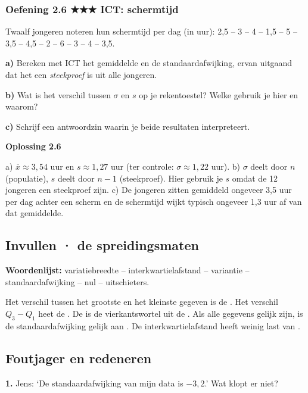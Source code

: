 \subsubsection*{Oefening 2.6 \quad ★★★ \quad ICT: schermtijd}

Twaalf jongeren noteren hun schermtijd per dag (in uur): 2,5 – 3 – 4 – 1,5 – 5 – 3,5 – 4,5 – 2 – 6 – 3 – 4 – 3,5.

\textbf{a)} Bereken met ICT het gemiddelde en de standaardafwijking, ervan uitgaand dat het een \emph{steekproef} is uit alle jongeren. \lijn

\textbf{b)} Wat is het verschil tussen $\sigma$ en $s$ op je rekentoestel? Welke gebruik je hier en waarom? \lijn

\textbf{c)} Schrijf een antwoordzin waarin je beide resultaten interpreteert. \lijn

\begin{oplossing}
\textbf{Oplossing 2.6}

a) $\overline{x}\approx 3{,}54$ uur en $s\approx 1{,}27$ uur (ter controle: $\sigma\approx 1{,}22$ uur). b) $\sigma$ deelt door $n$ (populatie), $s$ deelt door $n-1$ (steekproef). Hier gebruik je $s$ omdat de 12 jongeren een steekproef zijn. c) De jongeren zitten gemiddeld ongeveer 3,5 uur per dag achter een scherm en de schermtijd wijkt typisch ongeveer 1,3 uur af van dat gemiddelde.
\end{oplossing}

\subsection*{Invullen · de spreidingsmaten}

\textbf{Woordenlijst:} variatiebreedte – interkwartielafstand – variantie – standaardafwijking – nul – uitschieters.

Het verschil tussen het grootste en het kleinste gegeven is de . Het verschil $Q_3-Q_1$ heet de . De  is de vierkantswortel uit de . Als alle gegevens gelijk zijn, is de standaardafwijking gelijk aan . De interkwartielafstand heeft weinig last van .

\subsection*{Foutjager en redeneren}

\textbf{1.} Jens: ‘De standaardafwijking van mijn data is $-3{,}2$.’ Wat klopt er niet? \lijn

